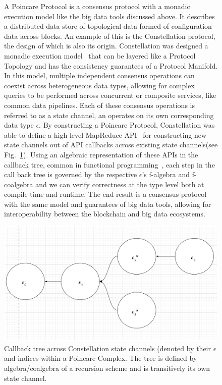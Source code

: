 \documentclass[runningheads]{llncs}
\begin{document}
\begin{figure}

A Poincare Protocol is a consensus protocol with a monadic execution model like the big data tools discussed above. It describes a distributed data store of topological data formed of configuration data across blocks. An example of this is the Constellation protocol, the design of which is also its origin. Constellation was designed a monadic execution model~\cite{ref_url6} that can be layered like a Protocol Topology and has the consistency guarantees of a Protocol Manifold. In this model, multiple independent consensus operations can coexist across heterogeneous data types, allowing for complex queries to be performed across concurrent or composite services, like common data pipelines. Each of these consensus operations is referred to as a state channel, an operates on its own corresponding data type $\epsilon$. By constructing a Poincare Protocol, Constellation was able to define a high level MapReduce API~\cite{ref_url3} for constructing new state channels out of API callbacks across existing state channels(see Fig.~\ref{fig4}). Using an algebraic representation of these APIs in the callback tree, common in functional programming~\cite{ref_book3}, each step in the call back tree is governed by the respective $\epsilon$'s f-algebra and f-coalgebra and we can verify correctness at the type level both at compile time and runtime. The end result is a consensus protocol with the same model and guarantees of big data tools, allowing for interoperability between the blockchain and big data ecosystems. 

\includegraphics[width=\textwidth]{state-channel-call-tree.png}
\caption{Callback tree across Constellation state channels (denoted by their $\epsilon$ and indices within a Poincare Complex. The tree is defined by algebra/coalgebra of a recursion scheme and is transitively its own state channel.} \label{fig4}
\end{figure}
\end{document}
